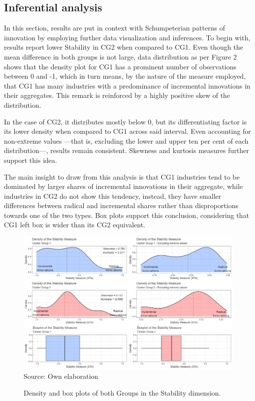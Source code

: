 \documentclass[12pt,a4paper]{article}
\begin{document}
\subsection{Inferential analysis}

In this section, results are put in context with Schumpeterian patterns of innovation by employing further data visualization and inferences. To begin with, results report lower Stability in CG2 when compared to CG1. Even though the mean difference in both groups is not large, data distribution as per Figure 2 shows that the density plot for CG1 has a prominent number of observations between 0 and -1, which in turn means, by the nature of the measure employed, that CG1 has many industries with a predominance of incremental innovations in their aggregates. This remark is reinforced by a highly positive skew of the distribution. 

In the case of CG2, it distributes mostly below 0, but its differentiating factor is its lower density when compared to CG1 across said interval. Even accounting for non-extreme values —that is, excluding the lower and upper ten per cent of each distribution—, results remain consistent. Skewness and kurtosis measures further support this idea. 

The main insight to draw from this analysis is that CG1 industries tend to be dominated by larger shares of incremental innovations in their aggregate, while industries in CG2 do not show this tendency, instead, they have smaller differences between radical and incremental shares rather than disproportions towards one of the two types. Box plots support this conclusion, considering that CG1 left box is wider than its CG2 equivalent.

\begin{figure}[H]	
	\caption{Density and box plots of both Groups in the Stability dimension.}
	\centering
	\includegraphics[scale = 0.45]{sta.png}
		Source: Own elaboration
\end{figure}
\end{document}
